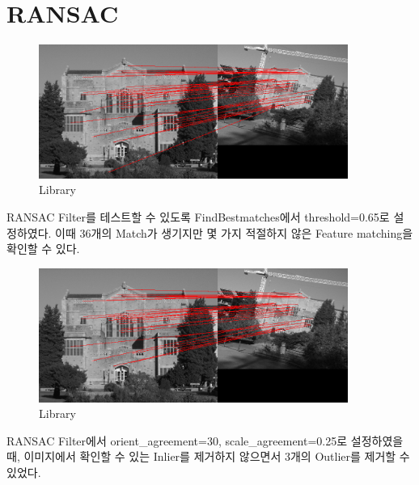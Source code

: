 \documentclass[]{report}
\begin{document}
\section{RANSAC}

\begin{figure}[ht!]
	\centering
	\includegraphics[width=0.9\textwidth]{image/3-2-library.png}
	\caption{Library}
	\label{3-2-library}
\end{figure}

RANSAC Filter를 테스트할 수 있도록 FindBestmatches에서 threshold=0.65로 설정하였다. 
이때 36개의 Match가 생기지만 몇 가지 적절하지 않은 Feature matching을 확인할 수 있다.\\

\begin{figure}[ht!]
	\centering
	\includegraphics[width=0.9\textwidth]{image/3-2-libraryF.png}
	\caption{Library}
	\label{3-2-libraryF}
\end{figure}

RANSAC Filter에서 orient\_agreement=30, scale\_agreement=0.25로 설정하였을 때,
이미지에서 확인할 수 있는 Inlier를 제거하지 않으면서 3개의 Outlier를 제거할 수 있었다.
\end{document}
